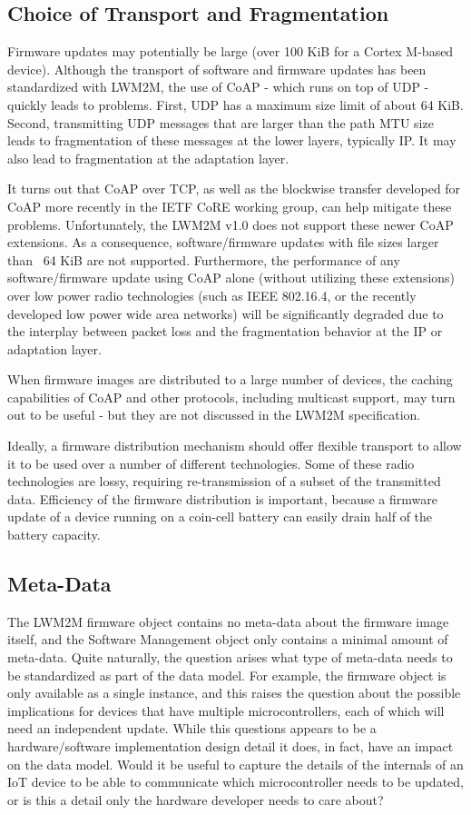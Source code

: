 \documentclass[peerreview, a4paper, 7pt]{IEEEtran}
\begin{document}
\subsection{Choice of Transport and Fragmentation}

Firmware updates may potentially be large (over 100 KiB for a Cortex M-based device). Although the transport of software and firmware updates has been standardized with LWM2M, the use of CoAP - which runs on top of UDP - quickly leads to problems. First, UDP has a maximum size limit of about 64 KiB. Second, transmitting UDP messages that are larger than the path MTU size leads to fragmentation of these messages at the lower layers, typically IP. It may also lead to fragmentation at the adaptation layer. 

It turns out that CoAP over TCP, as well as the blockwise transfer developed for CoAP more recently in the IETF CoRE working group, can help mitigate these problems. Unfortunately, the LWM2M v1.0 does not support these newer CoAP extensions. As a consequence, software/firmware updates with file sizes larger than ~64 KiB are not supported. Furthermore, the performance of any software/firmware update using CoAP alone (without utilizing these extensions) over low power radio technologies (such as IEEE 802.16.4, or the recently developed low power wide area networks) will be significantly degraded due to the interplay between packet loss and the fragmentation behavior at the IP or adaptation layer.

When firmware images are distributed to a large number of devices, the caching capabilities of CoAP and other protocols, including multicast support, may turn out to be useful - but they are not discussed in the LWM2M specification.

Ideally, a firmware distribution mechanism should offer flexible transport to allow it to be used over a number of different technologies. Some of these radio technologies are lossy, requiring re-transmission of a subset of the transmitted data. Efficiency of the firmware distribution is important, because a firmware update of a device running on a coin-cell battery can easily drain half of the battery capacity. 

\subsection{Meta-Data}

The LWM2M firmware object contains no meta-data about the firmware image itself, and the Software Management object only contains a minimal amount of meta-data. Quite naturally, the question arises what type of meta-data needs to be standardized as part of the data model. For example, the firmware object is only available as a single instance, and this raises the question about the possible implications for devices that have multiple microcontrollers, each of which will need an independent update. While this questions appears to be a hardware/software implementation design detail it does, in fact, have an impact on the data model. Would it be useful to capture the details of the internals of an IoT device to be able to communicate which microcontroller needs to be updated, or is this a detail only the hardware developer needs to care about? 
\end{document}

